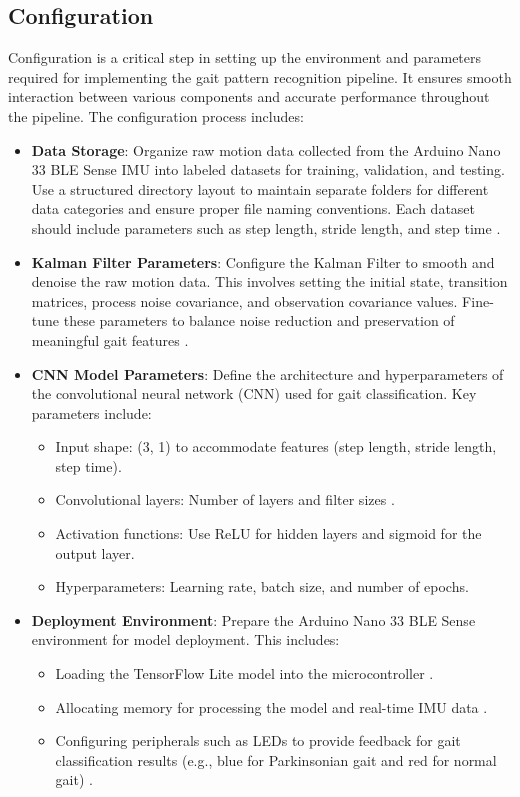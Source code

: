 \subsection{Configuration}

Configuration is a critical step in setting up the environment and parameters required for implementing the gait pattern recognition pipeline. It ensures smooth interaction between various components and accurate performance throughout the pipeline. The configuration process includes:

\begin{itemize}
    \item \textbf{Data Storage}: 
    Organize raw motion data collected from the Arduino Nano 33 BLE Sense IMU into labeled datasets for training, validation, and testing. Use a structured directory layout to maintain separate folders for different data categories and ensure proper file naming conventions. Each dataset should include parameters such as step length, stride length, and step time \cite{ZhangWenwen:2022}.

    \item \textbf{Kalman Filter Parameters}: 
    Configure the Kalman Filter to smooth and denoise the raw motion data. This involves setting the initial state, transition matrices, process noise covariance, and observation covariance values. Fine-tune these parameters to balance noise reduction and preservation of meaningful gait features \cite{Kalman:2012}.

    \item \textbf{CNN Model Parameters}: 
    Define the architecture and hyperparameters of the convolutional neural network (CNN) used for gait classification. Key parameters include:
    \begin{itemize}
        \item Input shape: (3, 1) to accommodate features (step length, stride length, step time).
        \item Convolutional layers: Number of layers and filter sizes \cite{Panebianco:2018}.
        \item Activation functions: Use ReLU for hidden layers and sigmoid for the output layer.
        \item Hyperparameters: Learning rate, batch size, and number of epochs\cite{Panebianco:2018}.
    \end{itemize}

    \item \textbf{Deployment Environment}: 
    Prepare the Arduino Nano 33 BLE Sense environment for model deployment. This includes:
    \begin{itemize}
        \item Loading the TensorFlow Lite model into the microcontroller \cite{Sulaimon:2021}.
        \item Allocating memory for processing the model and real-time IMU data \cite{ArduinoNano33Sense2025}.
        \item Configuring peripherals such as LEDs to provide feedback for gait classification results (e.g., blue for Parkinsonian gait and red for normal gait) \cite{ArduinoNano33Sense2025}.
    \end{itemize}
\end{itemize}
